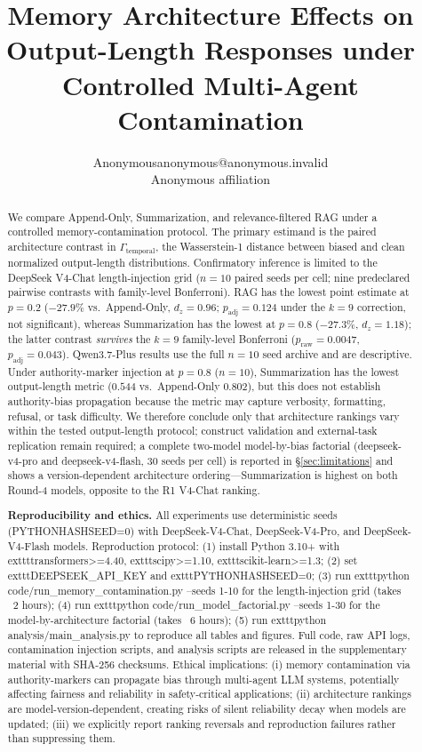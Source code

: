 \documentclass[11pt]{article}
\title{Memory Architecture Effects on Output-Length Responses under Controlled Multi-Agent Contamination}
\author{\name Anonymous\email anonymous@anonymous.invalid\\\addr Anonymous affiliation}
\date{}
\begin{document}
\maketitle

\begin{abstract}
We compare Append-Only, Summarization, and relevance-filtered RAG under a controlled memory-contamination protocol. The primary estimand is the paired architecture contrast in $\Gamma_{\text{temporal}}$, the Wasserstein-1 distance between biased and clean normalized output-length distributions. Confirmatory inference is limited to the DeepSeek V4-Chat length-injection grid ($n{=}10$ paired seeds per cell; nine predeclared pairwise contrasts with family-level Bonferroni). RAG has the lowest point estimate at $p{=}0.2$ ($-27.9\%$ vs.\ Append-Only, $d_z{=}0.96$; $p_{\text{adj}}{=}0.124$ under the $k{=}9$ correction, not significant), whereas Summarization has the lowest at $p{=}0.8$ ($-27.3\%$, $d_z{=}1.18$); the latter contrast \emph{survives} the $k{=}9$ family-level Bonferroni ($p_{\text{raw}}{=}0.0047$, $p_{\text{adj}}{=}0.043$). Qwen3.7-Plus results use the full $n{=}10$ seed archive and are descriptive. Under authority-marker injection at $p{=}0.8$ ($n{=}10$), Summarization has the lowest output-length metric ($0.544$ vs.\ Append-Only $0.802$), but this does not establish authority-bias propagation because the metric may capture verbosity, formatting, refusal, or task difficulty. We therefore conclude only that architecture rankings vary within the tested output-length protocol; construct validation and external-task replication remain required; a complete two-model model-by-bias factorial (deepseek-v4-pro and deepseek-v4-flash, 30 seeds per cell) is reported in \S\ref{sec:limitations} and shows a version-dependent architecture ordering---Summarization is highest on both Round-4 models, opposite to the R1 V4-Chat ranking.


\textbf{Reproducibility and ethics.} All experiments use deterministic seeds (PYTHONHASHSEED=0) with DeepSeek-V4-Chat, DeepSeek-V4-Pro, and DeepSeek-V4-Flash models. Reproduction protocol: (1) install Python 3.10+ with 	exttt{transformers>=4.40}, 	exttt{scipy>=1.10}, 	exttt{scikit-learn>=1.3}; (2) set 	exttt{DEEPSEEK\_API\_KEY} and 	exttt{PYTHONHASHSEED=0}; (3) run 	exttt{python code/run\_memory\_contamination.py --seeds 1-10} for the length-injection grid (takes ~2 hours); (4) run 	exttt{python code/run\_model\_factorial.py --seeds 1-30} for the model-by-architecture factorial (takes ~6 hours); (5) run 	exttt{python analysis/main\_analysis.py} to reproduce all tables and figures. Full code, raw API logs, contamination injection scripts, and analysis scripts are released in the supplementary material with SHA-256 checksums. Ethical implications: (i) memory contamination via authority-markers can propagate bias through multi-agent LLM systems, potentially affecting fairness and reliability in safety-critical applications; (ii) architecture rankings are model-version-dependent, creating risks of silent reliability decay when models are updated; (iii) we explicitly report ranking reversals and reproduction failures rather than suppressing them.\end{abstract}
\end{document}
